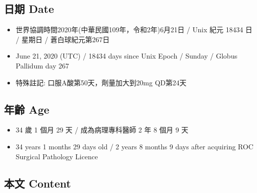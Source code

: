 \documentclass[a5paper, 11pt
]{book}
\providecommand{\tightlist}{%
  \setlength{\itemsep}{0pt}\setlength{\parskip}{0pt}}
\begin{document}
\hypertarget{ux65e5ux671f-date-20}{%
\subsection{日期 Date}\label{ux65e5ux671f-date-20}}

\begin{itemize}
\tightlist
\item
  世界協調時間2020年(中華民國109年，令和2年)6月21日 / Unix 紀元 18434 日
  / 星期日 / 蒼白球紀元第267日
\item
  June 21, 2020 (UTC) / 18434 days since Unix Epoch / Sunday / Globus
  Pallidum day 267
\item
  特殊註記: 口服A酸第50天，劑量加大到20mg QD第24天
\end{itemize}

\hypertarget{ux5e74ux9f61-age-20}{%
\subsection{年齡 Age}\label{ux5e74ux9f61-age-20}}

\begin{itemize}
\tightlist
\item
  34 歲 1 個月 29 天 / 成為病理專科醫師 2 年 8 個月 9 天
\item
  34 years 1 months 29 days old / 2 years 8 months 9 days after
  acquiring ROC Surgical Pathology Licence
\end{itemize}

\hypertarget{ux672cux6587-content-20}{%
\subsection{本文 Content}\label{ux672cux6587-content-20}}
\end{document}
